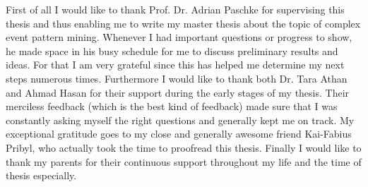 
\begin{acknowledgements}      

First of all I would like to thank Prof. Dr. Adrian Paschke for supervising this thesis and thus enabling me to write my master thesis about the topic of complex event pattern mining. Whenever I had important questions or progress to show, he made space in his busy schedule for me to discuss preliminary results and ideas. For that I am very grateful since this has helped me determine my next steps numerous times. Furthermore I would like to thank both Dr. Tara Athan and Ahmad Hasan for their support during the early stages of my thesis. Their merciless feedback (which is the best kind of feedback) made sure that I was constantly asking myself the right questions and generally kept me on track. My exceptional gratitude goes to my close and generally awesome friend Kai-Fabius Pribyl, who actually took the time to proofread this thesis. Finally I would like to thank my parents for their continuous support throughout my life and the time of thesis especially. \\

\end{acknowledgements}
